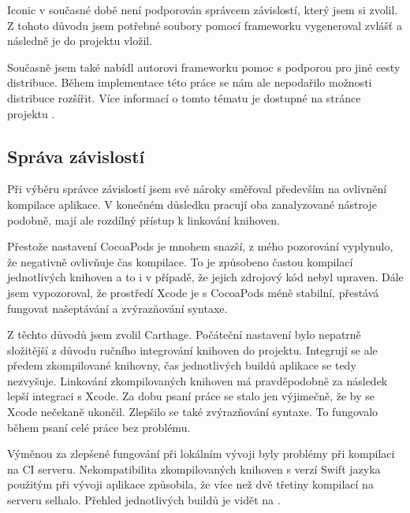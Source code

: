 Iconic v současné době není podporován správcem závislostí, který jsem si zvolil.
Z tohoto důvodu jsem potřebné soubory pomocí frameworku vygeneroval zvlášť a následně je do projektu vložil.

Současně jsem také nabídl autorovi frameworku pomoc s podporou pro jiné cesty distribuce.
Během implementace této práce se nám ale nepodařilo možnosti distribuce rozšířit.
Více informací o tomto tématu je dostupné na stránce projektu \cite{github-iconic-brew}.

\subsection{Správa závislostí}

Při výběru správce závislostí jsem své nároky směřoval především na ovlivnění kompilace aplikace.
V konečném důsledku pracují oba zanalyzované nástroje podobně, mají ale rozdílný přístup k linkování knihoven.

Přestože nastavení CocoaPods je mnohem snazší, z mého pozorování vyplynulo, že negativně ovlivňuje čas kompilace.
To je způsobeno častou kompilací jednotlivých knihoven a to i v případě, že jejich zdrojový kód nebyl upraven.
Dále jsem vypozoroval, že prostředí Xcode je s CocoaPods méně stabilní, přestává fungovat našeptávání a zvýrazňování syntaxe.

Z těchto důvodů jsem zvolil Carthage.
Počáteční nastavení bylo nepatrně složitější z důvodu ručního integrování knihoven do projektu.
Integrují se ale předem zkompilované knihovny, čas jednotlivých buildů aplikace se tedy nezvyšuje.
Linkování zkompilovaných knihoven má pravděpodobně za následek lepší integraci s Xcode.
Za dobu psaní práce se stalo jen výjimečně, že by se Xcode nečekaně ukončil.
Zlepšilo se také zvýrazňování syntaxe.
To fungovalo během psaní celé práce bez problému.

Výměnou za zlepšené fungování při lokálním vývoji byly problémy při kompilaci na CI serveru.
Nekompatibilita zkompilovaných knihoven s verzí Swift jazyka použitým při vývoji aplikace způsobila, že více než dvě třetiny kompilací na serveru selhalo.
Přehled jednotlivých buildů je vidět na \cite{travis-octophone-builds}.
